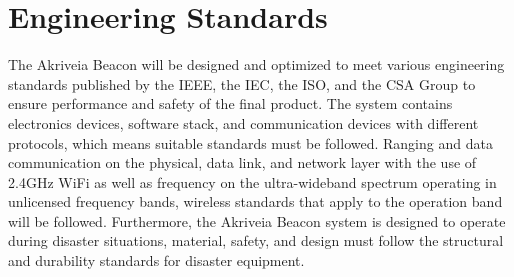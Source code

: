 
\setcounter{section}{2}
\section{Engineering Standards}
\bigskip

The Akriveia Beacon will be designed and optimized to meet various engineering standards published by the IEEE, the IEC, the ISO, and the CSA Group to ensure performance and safety of the final product. The system contains electronics devices, software stack, and communication devices with different protocols, which means suitable standards must be followed. Ranging and data communication on the physical, data link, and network layer with the use of 2.4GHz WiFi as well as frequency on the ultra-wideband spectrum operating in unlicensed frequency bands, wireless standards that apply to the operation band will be followed. Furthermore, the Akriveia Beacon system is designed to operate during disaster situations, material, safety, and design must follow the structural and durability standards for disaster equipment. 



